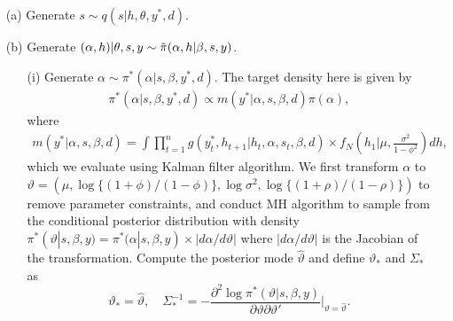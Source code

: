 \begin{itemize}
    \item[(a)] Generate $s \sim q(s|h, \theta, y^*, d)$.
    
    \item[(b)] Generate $(\alpha,h)|\theta, s, y \sim \Tilde{\pi}(\alpha, h|\beta, s, y)$.
           \begin{itemize}
        \item[(i)]  Generate $\alpha \sim \pi^*(\alpha|s,\beta,y^*,d)$.
        The target density here is given by
        \begin{align*}
        \pi^*(\alpha| s, \beta, y^*,d) \propto  m(y^*|\alpha,s,\beta,d) \pi(\alpha),
        \end{align*}
        where 
        \begin{align*}
        m(y^*|\alpha,s,\beta,d) = \int \prod_{t=1}^n g(y_t^*, h_{t+1}| h_t, \alpha, s_t, \beta, d) \times f_N \left( h_1 \bigg| \mu, \frac{\sigma^2}{1-\phi^2} \right) dh,
        \end{align*}
        which we evaluate using Kalman filter algorithm.
        We first transform $\alpha$ to $\vartheta = (\mu, \log\{ (1+\phi)/(1-\phi) \}, \log \sigma^2, \log\{ (1+\rho)/(1-\rho) \})$ to remove parameter constraints, and conduct MH algorithm to sample from the conditional posterior distribution with density $\pi^*(\vartheta|s,\beta,y) = \pi^*(\alpha|s, \beta,y) \times |d\alpha / d\vartheta|$ where $|d\alpha / d\vartheta|$ is the Jacobian of the transformation. 
        Compute the posterior mode $\hat{\vartheta}$ and define $\vartheta_*$ and $\Sigma_*$ as
        \begin{equation*}
        \vartheta_* = \hat{\vartheta}, \quad
        \Sigma_*^{-1} = -\frac{\partial^2 \log \pi^*(\vartheta|s,\beta, y)}{\partial \vartheta \partial \vartheta'} \bigg|_{\vartheta = \hat{\vartheta}}.
        \end{equation*}
    

\end{itemize}
\end{itemize}

